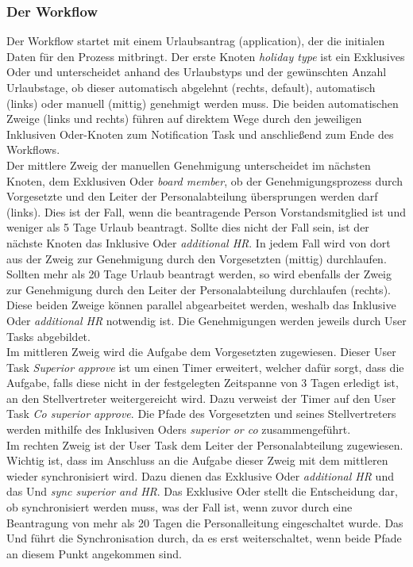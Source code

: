 \subsubsection{Der Workflow}
Der Workflow startet mit einem Urlaubsantrag (application), der die initialen Daten für den Prozess mitbringt. Der erste Knoten \textit{holiday type} ist ein Exklusives Oder und unterscheidet anhand des Urlaubstyps und der gewünschten Anzahl Urlaubstage, ob dieser automatisch abgelehnt (rechts, default), automatisch (links) oder manuell (mittig) genehmigt werden muss. Die beiden automatischen Zweige (links und rechts) führen auf direktem Wege durch den jeweiligen Inklusiven Oder-Knoten zum Notification Task und anschließend zum Ende des Workflows.\\
Der mittlere Zweig der manuellen Genehmigung unterscheidet im nächsten Knoten, dem Exklusiven Oder \textit{board member}, ob der Genehmigungsprozess durch Vorgesetzte und den Leiter der Personalabteilung übersprungen werden darf (links). Dies ist der Fall, wenn die beantragende Person Vorstandsmitglied ist und weniger als 5 Tage Urlaub beantragt. Sollte dies nicht der Fall sein, ist der nächste Knoten das Inklusive Oder \textit{additional HR}. In jedem Fall wird von dort aus der Zweig zur Genehmigung durch den Vorgesetzten (mittig) durchlaufen. Sollten mehr als 20 Tage Urlaub beantragt werden, so wird ebenfalls der Zweig zur Genehmigung durch den Leiter der Personalabteilung durchlaufen (rechts). Diese beiden Zweige können parallel abgearbeitet werden, weshalb das Inklusive Oder \textit{additional HR} notwendig ist. Die Genehmigungen werden jeweils durch User Tasks abgebildet.\\
Im mittleren Zweig wird die Aufgabe dem Vorgesetzten zugewiesen. Dieser User Task \textit{Superior approve} ist um einen Timer erweitert, welcher dafür sorgt, dass die Aufgabe, falls diese nicht in der festgelegten Zeitspanne von 3 Tagen erledigt ist, an den Stellvertreter weitergereicht wird. Dazu verweist der Timer auf den User Task \textit{Co superior approve}. Die Pfade des Vorgesetzten und seines Stellvertreters werden mithilfe des Inklusiven Oders \textit{superior or co} zusammengeführt.\\
Im rechten Zweig ist der User Task dem Leiter der Personalabteilung zugewiesen. Wichtig ist, dass im Anschluss an die Aufgabe dieser Zweig mit dem mittleren wieder synchronisiert wird. Dazu dienen das Exklusive Oder \textit{additional HR} und das Und \textit{sync superior and HR}. Das Exklusive Oder stellt die Entscheidung dar, ob synchronisiert werden muss, was der Fall ist, wenn zuvor durch eine Beantragung von mehr als 20 Tagen die Personalleitung eingeschaltet wurde. Das Und führt die Synchronisation durch, da es erst weiterschaltet, wenn beide Pfade an diesem Punkt angekommen sind.\\
